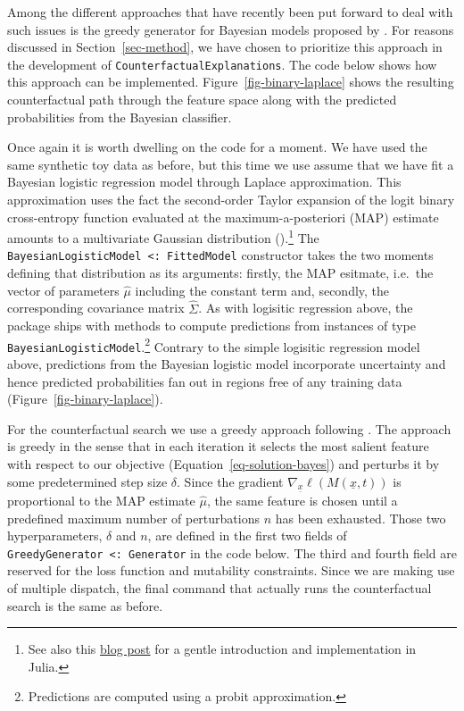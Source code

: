 \documentclass{juliacon}
\begin{document}
Among the different approaches that have recently been put forward to
deal with such issues is the greedy generator for Bayesian models
proposed by \cite{schut2021generating}. For reasons discussed in
Section~\ref{sec-method}, we have chosen to prioritize this approach in
the development of \texttt{CounterfactualExplanations}. The code below
shows how this approach can be implemented.
Figure~\ref{fig-binary-laplace} shows the resulting counterfactual path
through the feature space along with the predicted probabilities from
the Bayesian classifier.

Once again it is worth dwelling on the code for a moment. We have used
the same synthetic toy data as before, but this time we use assume that
we have fit a Bayesian logistic regression model through Laplace
approximation. This approximation uses the fact the second-order Taylor
expansion of the logit binary cross-entropy function evaluated at the
maximum-a-posteriori (MAP) estimate amounts to a multivariate Gaussian
distribution (\cite{murphy2022probabilistic}).\footnote{See also this
  \href{https://www.paltmeyer.com/blog/posts/effortsless-bayesian-dl/}{blog
  post} for a gentle introduction and implementation in Julia.} The
\texttt{BayesianLogisticModel\ \textless{}:\ FittedModel} constructor
takes the two moments defining that distribution as its arguments:
firstly, the MAP esitmate, i.e.~the vector of parameters \(\hat\mu\)
including the constant term and, secondly, the corresponding covariance
matrix \(\hat{\Sigma}\). As with logisitic regression above, the package
ships with methods to compute predictions from instances of type
\texttt{BayesianLogisticModel}.\footnote{Predictions are computed using
  a probit approximation.} Contrary to the simple logisitic regression
model above, predictions from the Bayesian logistic model incorporate
uncertainty and hence predicted probabilities fan out in regions free of
any training data (Figure~\ref{fig-binary-laplace}).

For the counterfactual search we use a greedy approach following
\cite{schut2021generating}. The approach is greedy in the sense that in
each iteration it selects the most salient feature with respect to our
objective (Equation~\ref{eq-solution-bayes}) and perturbs it by some
predetermined step size \(\delta\). Since the gradient
\(\nabla_{\underline{x}}\ell(M(\underline{x},t))\) is proportional to
the MAP estimate \(\hat\mu\), the same feature is chosen until a
predefined maximum number of perturbations \(n\) has been exhausted.
Those two hyperparameters, \(\delta\) and \(n\), are defined in the
first two fields of \texttt{GreedyGenerator\ \textless{}:\ Generator} in
the code below. The third and fourth field are reserved for the loss
function and mutability constraints. Since we are making use of multiple
dispatch, the final command that actually runs the counterfactual search
is the same as before.
\end{document}

